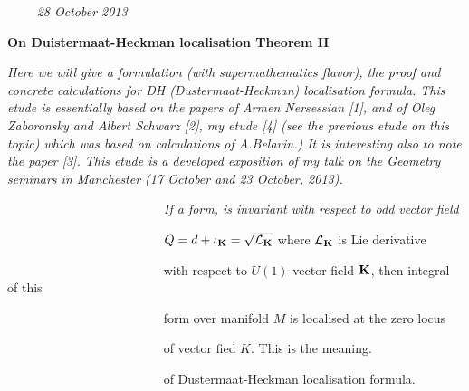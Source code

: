 
\def\vare {\varepsilon}
\def\A {{\bf A}}
\def\FF {{\bf F}}
\def\a {\alpha}
\def\K {{\bf K}}
\def\s {{\sigma}}
\def\p{\partial}
\def\vare{{\varepsilon}}
\def\L {{\cal L}}
\def\G {{\Gamma}}
\def\C {{\bf C}}
\def\Z {{\bf Z}}
\def\U  {{\cal U}}
\def\R  {{\bf R}}
\def\E  {{\bf E}}
\def\l {\lambda}
\def\degree {{\bf {\rm degree}\,\,}}
\def \finish {${\,\,\vrule height1mm depth2mm width 8pt}$}
\def \m {\medskip}
\def\r {{\bf r}}
\def\v {{\bf v}}
\def\n {{\bf n}}
\def\b {{\bf b}}
\def\ss  {{\bf s }}
\def\e{{\bf e}}
\def\ac {{\bf a}}
\def \X   {{\bf X}}
\def \Y   {{\bf Y}}
\def \x   {{\bf x}}
\def \y   {{\bf y}}
\def\w {{\omega}} 
\def\wv {{\buildrel \rightarrow\over \omega}}

\def\K{{\bf K}}
\def\locus {\hbox{locus of $\K$}}


$\qquad$ {\sl 28 October 2013}

\bigskip

\centerline {\bf On Duistermaat-Heckman localisation Theorem II}

\m

{\it
   Here we will give a formulation (with
supermathematics flavor), the proof and concrete
calculations
for DH (Dustermaat-Heckman) localisation formula. This
etude is essentially based on the papers of Armen
Nersessian [1], and
of  Oleg Zaboronsky and Albert Schwarz [2], my etude
[4] (see the previous etude on this topic) which was based on calculations 
of A.Belavin.) It is interesting also to note the paper [3].
This etude is a  developed exposition of my talk
on the Geometry seminars in Manchester
(17 October and 23 October, 2013).}


\m
      \medskip
{\sl
  $\qquad\qquad$$\qquad\qquad$$\qquad\qquad$ If a form, 
  is invariant with respect to odd vector field


$\qquad\qquad$$\qquad\qquad$$\qquad\qquad$  
  $Q=d+\iota_\K=\sqrt {\L_\K}$ 
   where $\L_\K$ is Lie derivative 

$\qquad\qquad$$\qquad\qquad$$\qquad\qquad$ with respect
 to $U(1)$-vector field $\K$, then integral of this 

$\qquad\qquad$$\qquad\qquad$$\qquad\qquad$ form over manifold
  $M$ is localised at the zero locus 

$\qquad\qquad$$\qquad\qquad$$\qquad\qquad$ of vector fied $K$. This is the
 meaning.

$\qquad\qquad$$\qquad\qquad$$\qquad\qquad$ 
of Dustermaat-Heckman localisation formula.

}
 $$ $$


